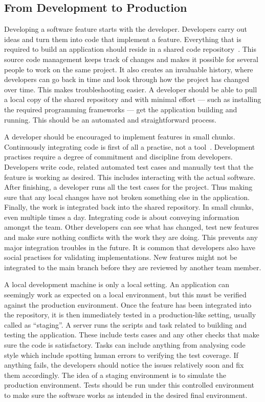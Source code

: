 \documentclass[english]{tktltiki2}
\begin{document}
\subsection{From Development to Production}

Developing a software feature starts with the developer. Developers carry out ideas and turn them into code that implement a feature. Everything that is required to build an application should reside in a shared code repository~\cite{HF11}. This source code management keeps track of changes and makes it possible for several people to work on the same project. It also creates an invaluable history, where developers can go back in time and look through how the project has changed over time. This makes troubleshooting easier. A developer should be able to pull a local copy of the shared repository and with minimal effort — such as installing the required programming frameworks — get the application building and running. This should be an automated and straightforward process.

A developer should be encouraged to implement features in small chunks. Continuously integrating code is first of all a practise, not a tool~\cite{HF11}. Development practises require a degree of commitment and discipline from developers. Developers write code, related automated test cases and manually test that the feature is working as desired. This includes interacting with the actual software. After finishing, a developer runs all the test cases for the project. Thus making sure that any local changes have not broken something else in the application. Finally, the work is integrated back into the shared repository. In small chunks, even multiple times a day. Integrating code is about conveying information amongst the team. Other developers can see what has changed, test new features and make sure nothing conflicts with the work they are doing. This prevents any major integration troubles in the future. It is common that developers also have social practises for validating implementations. New features might not be integrated to the main branch before they are reviewed by another team member.

A local development machine is only a local setting. An application can seemingly work as expected on a local environment, but this must be verified against the production environment. Once the feature has been integrated into the repository, it is then immediately tested in a production-like setting, usually called as “staging”. A server runs the scripts and task related to building and testing the application. These include tests cases and any other checks that make sure the code is satisfactory. Tasks can include anything from analysing code style which include spotting human errors to verifying the test coverage. If anything fails, the developers should notice the issues relatively soon and fix them accordingly. The idea of a staging environment is to simulate the production environment. Tests should be run under this controlled environment to make sure the software works as intended in the desired final environment.
\end{document}
